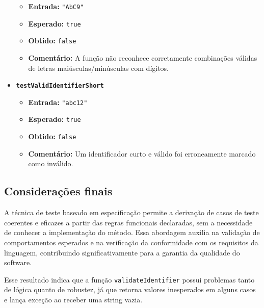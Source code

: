 \documentclass[
  letterpaper,
  DIV=11,
  numbers=noendperiod]{scrartcl}
\providecommand{\tightlist}{%
  \setlength{\itemsep}{0pt}\setlength{\parskip}{0pt}}
\begin{document}
\begin{itemize}
  \begin{itemize}
  \tightlist
  \item
    \textbf{Entrada:} \texttt{"AbC9"}\\
  \item
    \textbf{Esperado:} \texttt{true}\\
  \item
    \textbf{Obtido:} \texttt{false}\\
  \item
    \textbf{Comentário:} A função não reconhece corretamente combinações
    válidas de letras maiúsculas/minúsculas com dígitos.
  \end{itemize}
\item
  \textbf{\texttt{testValidIdentifierShort}}

  \begin{itemize}
  \tightlist
  \item
    \textbf{Entrada:} \texttt{"abc12"}\\
  \item
    \textbf{Esperado:} \texttt{true}\\
  \item
    \textbf{Obtido:} \texttt{false}\\
  \item
    \textbf{Comentário:} Um identificador curto e válido foi
    erroneamente marcado como inválido.
  \end{itemize}
\end{itemize}

\subsection{Considerações finais}\label{considerauxe7uxf5es-finais}

A técnica de teste baseado em especificação permite a derivação de casos
de teste coerentes e eficazes a partir das regras funcionais declaradas,
sem a necessidade de conhecer a implementação do método. Essa abordagem
auxilia na validação de comportamentos esperados e na verificação da
conformidade com os requisitos da linguagem, contribuindo
significativamente para a garantia da qualidade do software.

Esse resultado indica que a função \texttt{validateIdentifier} possui
problemas tanto de lógica quanto de robustez, já que retorna valores
inesperados em alguns casos e lança exceção ao receber uma string vazia.
\end{document}
